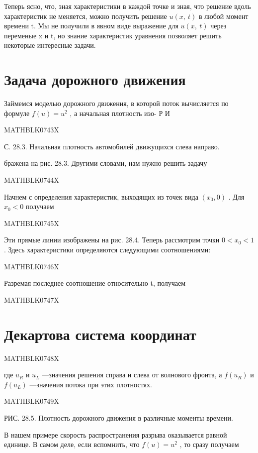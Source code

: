 \documentclass[
]{article}
\begin{document}
Теперь ясно, что, зная характеристики в каждой точке и зная, что решение
вдоль характеристик не меняется, можно получить решение
\(u\left(x,\ t\right)\) в любой момент времени t. Мы не получили в явном
виде выражение для \(u\left(x,\ t\right)\) через переменые x и t, но
знание характеристик уравнения позволяет решить некоторые интересные
задачи.

\section{Задача дорожного
движения}\label{ux437ux430ux434ux430ux447ux430-ux434ux43eux440ux43eux436ux43dux43eux433ux43e-ux434ux432ux438ux436ux435ux43dux438ux44f}

Займемся моделью дорожного движения, в которой поток вычисляется по
формуле \(f(u)=u^2\) , а начальная плотность изо- Р И

MATHBLK0743X

С. 28.3. Начальная плотность автомобилей движущихся слева направо.

бражена на рис. 28.3. Другими словами, нам нужно решить задачу

MATHBLK0744X

Начнем с определения характеристик, выходящих из точек вида \((x_0, 0)\)
. Для \(x_0 < 0\) получаем

MATHBLK0745X

Эти прямые линии изображены на рис. 28.4. Теперь рассмотрим точки
\(0 < x_0 < 1\) . Здесь характеристики определяются следующими
соотношениями:

MATHBLK0746X

Разремая последнее соотношение относительно t, получаем

MATHBLK0747X

\section{Декартова система
координат}\label{ux434ux435ux43aux430ux440ux442ux43eux432ux430-ux441ux438ux441ux442ux435ux43cux430-ux43aux43eux43eux440ux434ux438ux43dux430ux442}

MATHBLK0748X

где \(u_R\) и \(u_L\) ---значения решения справа и слева от волнового
фронта, а \(f(u_R)\) и \(f(u_L)\) ---значения потока при этих
плотностях.

MATHBLK0749X

РИС. 28.5. Плотность дорожного движения в различные моменты времени.

В нашем примере скорость распространения разрыва оказывается равной
единице. В самом деле, если вспомнить, что \(f(u) = u^2\) , то сразу
получаем
\end{document}
